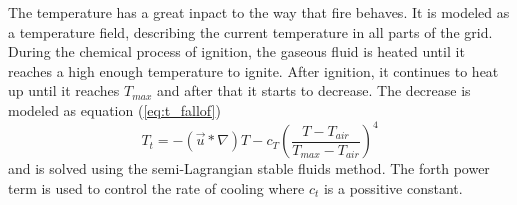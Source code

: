 The temperature has a great inpact to the way that fire behaves.
It is modeled as a temperature field, describing the current temperature in all parts of the grid.
During the chemical process of ignition, the gaseous fluid is heated until it reaches a high enough temperature to ignite.
After ignition, it continues to heat up until it reaches $T_{max}$ and after that it starts to decrease. 
The decrease is modeled as equation (\ref{eq:t_fallof})
\begin{equation}
\label{eq:t_fallof}
T_t = -(\vec{u} * \nabla) T - c_T (\frac{T - T_{air}}{T_{max}-T_{air}})^4
\end{equation}
and is solved using the semi-Lagrangian stable fluids method. 
The forth power term is used to control the rate of cooling where $c_t$ is a possitive constant.
